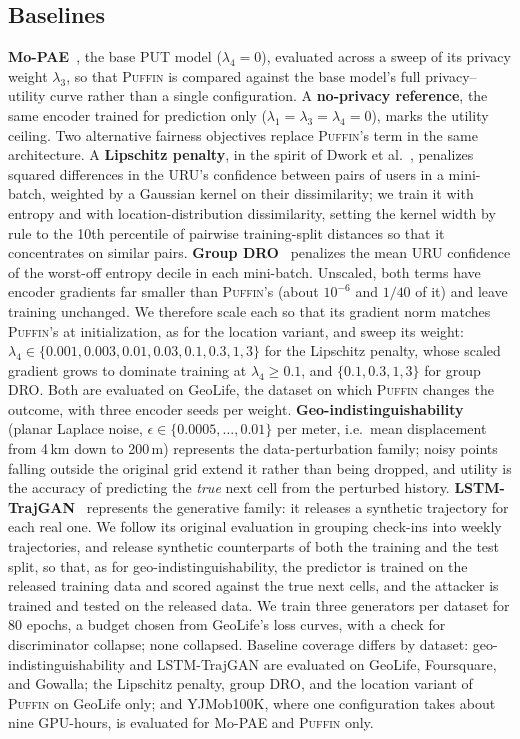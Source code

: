 \documentclass[sigconf,anonymous,review]{acmart}
\newcommand{\puffin}{\textsc{Puffin}}
\begin{document}
\subsection{Baselines}
\label{sec:setup-baselines}
\textbf{Mo-PAE}~\cite{zhan2023mopae}, the base PUT model ($\lambda_4=0$), evaluated across a sweep of its privacy weight $\lambda_3$, so that \puffin{} is compared against the base model's full privacy--utility curve rather than a single configuration. A \textbf{no-privacy reference}, the same encoder trained for prediction only ($\lambda_1=\lambda_3=\lambda_4=0$), marks the utility ceiling. Two alternative fairness objectives replace \puffin's term in the same architecture. A \textbf{Lipschitz penalty}, in the spirit of Dwork et al.~\cite{dwork2012fairness}, penalizes squared differences in the URU's confidence between pairs of users in a mini-batch, weighted by a Gaussian kernel on their dissimilarity; we train it with entropy and with location-distribution dissimilarity, setting the kernel width by rule to the 10th percentile of pairwise training-split distances so that it concentrates on similar pairs. \textbf{Group DRO}~\cite{sagawa2020dro} penalizes the mean URU confidence of the worst-off entropy decile in each mini-batch. Unscaled, both terms have encoder gradients far smaller than \puffin's (about $10^{-6}$ and $1/40$ of it) and leave training unchanged. We therefore scale each so that its gradient norm matches \puffin's at initialization, as for the location variant, and sweep its weight: $\lambda_4\in\{0.001,0.003,0.01,0.03,0.1,0.3,1,3\}$ for the Lipschitz penalty, whose scaled gradient grows to dominate training at $\lambda_4\ge0.1$, and $\{0.1,0.3,1,3\}$ for group DRO. Both are evaluated on GeoLife, the dataset on which \puffin{} changes the outcome, with three encoder seeds per weight. \textbf{Geo-indistinguishability}~\cite{andres2013geo} (planar Laplace noise, $\epsilon\in\{0.0005,\dots,0.01\}$ per meter, i.e.\ mean displacement from 4\,km down to 200\,m) represents the data-perturbation family; noisy points falling outside the original grid extend it rather than being dropped, and utility is the accuracy of predicting the \emph{true} next cell from the perturbed history. \textbf{LSTM-TrajGAN}~\cite{rao2020trajgan} represents the generative family: it releases a synthetic trajectory for each real one. We follow its original evaluation in grouping check-ins into weekly trajectories, and release synthetic counterparts of both the training and the test split, so that, as for geo-indistinguishability, the predictor is trained on the released training data and scored against the true next cells, and the attacker is trained and tested on the released data. We train three generators per dataset for 80 epochs, a budget chosen from GeoLife's loss curves, with a check for discriminator collapse; none collapsed. Baseline coverage differs by dataset: geo-indistinguishability and LSTM-TrajGAN are evaluated on GeoLife, Foursquare, and Gowalla; the Lipschitz penalty, group DRO, and the location variant of \puffin{} on GeoLife only; and YJMob100K, where one configuration takes about nine GPU-hours, is evaluated for Mo-PAE and \puffin{} only.
\end{document}
